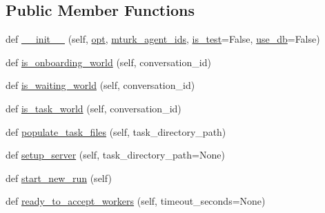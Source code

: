 \subsection*{Public Member Functions}
\begin{DoxyCompactItemize}
\item 
def \hyperlink{classparlai_1_1mturk_1_1core_1_1dev_1_1mturk__manager_1_1MTurkManager_add88d49ae7a5b5ee28b83267eae0ac76}{\+\_\+\+\_\+init\+\_\+\+\_\+} (self, \hyperlink{classparlai_1_1mturk_1_1core_1_1dev_1_1mturk__manager_1_1MTurkManager_a07b188c1af35f83c7052aeabc11209d6}{opt}, \hyperlink{classparlai_1_1mturk_1_1core_1_1dev_1_1mturk__manager_1_1MTurkManager_afca2e324498c96eff4000273848b5760}{mturk\+\_\+agent\+\_\+ids}, \hyperlink{classparlai_1_1mturk_1_1core_1_1dev_1_1mturk__manager_1_1MTurkManager_adee3e80e1a38daf5b96ede29d4866e73}{is\+\_\+test}=False, \hyperlink{classparlai_1_1mturk_1_1core_1_1dev_1_1mturk__manager_1_1MTurkManager_a6691eab358eabbafbfa484e628e51c0a}{use\+\_\+db}=False)
\item 
def \hyperlink{classparlai_1_1mturk_1_1core_1_1dev_1_1mturk__manager_1_1MTurkManager_af9050e4f1d79eec81797bc8a7b088835}{is\+\_\+onboarding\+\_\+world} (self, conversation\+\_\+id)
\item 
def \hyperlink{classparlai_1_1mturk_1_1core_1_1dev_1_1mturk__manager_1_1MTurkManager_a580354a4d418e988856f6433d7868956}{is\+\_\+waiting\+\_\+world} (self, conversation\+\_\+id)
\item 
def \hyperlink{classparlai_1_1mturk_1_1core_1_1dev_1_1mturk__manager_1_1MTurkManager_a0ed77b07d946fc884eb12ea8687c9250}{is\+\_\+task\+\_\+world} (self, conversation\+\_\+id)
\item 
def \hyperlink{classparlai_1_1mturk_1_1core_1_1dev_1_1mturk__manager_1_1MTurkManager_a54a96e3f6083886e28b6623826ad4b3f}{populate\+\_\+task\+\_\+files} (self, task\+\_\+directory\+\_\+path)
\item 
def \hyperlink{classparlai_1_1mturk_1_1core_1_1dev_1_1mturk__manager_1_1MTurkManager_a9dadf9294a803cba4d1dc67e3a570a00}{setup\+\_\+server} (self, task\+\_\+directory\+\_\+path=None)
\item 
def \hyperlink{classparlai_1_1mturk_1_1core_1_1dev_1_1mturk__manager_1_1MTurkManager_ac03227ae652350dbbda8890542c7338b}{start\+\_\+new\+\_\+run} (self)
\item 
def \hyperlink{classparlai_1_1mturk_1_1core_1_1dev_1_1mturk__manager_1_1MTurkManager_a86d4df3b35345542d8ac85bbb5287c4f}{ready\+\_\+to\+\_\+accept\+\_\+workers} (self, timeout\+\_\+seconds=None)
\item 

\end{DoxyCompactItemize}
